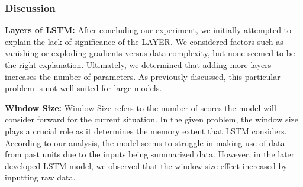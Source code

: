 \subsubsection{Discussion}
\textbf{Layers of LSTM: }
After concluding our experiment, we initially attempted to explain the lack of significance of the LAYER. We considered factors such as vanishing or exploding gradients versus data complexity, but none seemed to be the right explanation. Ultimately, we determined that adding more layers increases the number of parameters. As previously discussed, this particular problem is not well-suited for large models.\par
\textbf{Window Size: }
Window Size refers to the number of scores the model will consider forward for the current situation. In the given problem, the window size plays a crucial role as it determines the memory extent that LSTM considers. According to our analysis, the model seems to struggle in making use of data from past units due to the inputs being summarized data. However, in the later developed LSTM model, we observed that the window size effect increased by inputting raw data. \par